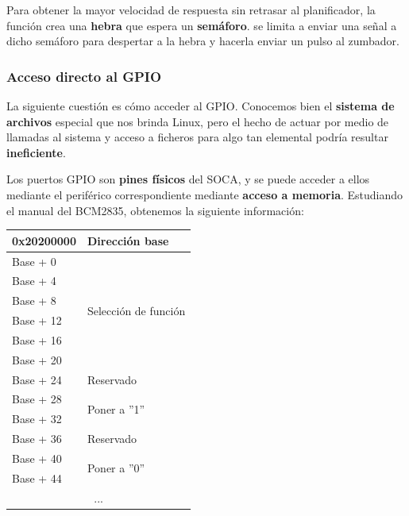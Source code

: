 Para obtener la mayor velocidad de respuesta sin retrasar al planificador, la función  crea una \textbf{hebra} que espera un \textbf{semáforo}.  se limita a enviar una señal a dicho semáforo para despertar a la hebra y hacerla enviar un pulso al zumbador.

\subsubsection{Acceso directo al GPIO}

La siguiente cuestión es cómo acceder al \acrshort{GPIO}. Conocemos bien el \textbf{sistema de archivos} especial que nos brinda Linux, pero el hecho de actuar por medio de llamadas al sistema y acceso a ficheros para algo tan elemental podría resultar \textbf{ineficiente}.

Los puertos \acrshort{GPIO} son \textbf{pines físicos} del \acrshort{SOCA}, y se puede acceder a ellos mediante el periférico correspondiente mediante \textbf{acceso a memoria}. Estudiando el manual del BCM2835, obtenemos la siguiente información:

\smallskip

\begin{center}
	\begin{tabular}{|l|l|}
		\hline 0x20200000 & Dirección base \\
		\hline
		\hline Base + 0 & \multirow{6}{*}{Selección de función} \\
		\cline{1-1} Base + 4 & \\
		\cline{1-1} Base + 8 & \\
		\cline{1-1} Base + 12 & \\
		\cline{1-1} Base + 16 & \\
		\cline{1-1} Base + 20 & \\
		\hline Base + 24 & Reservado \\
		\hline Base + 28 & \multirow{2}{*}{Poner a ''1''} \\
		\cline{1-1} Base + 32 & \\
		\hline Base + 36 & Reservado \\
		\hline Base + 40 & \multirow{2}{*}{Poner a ''0''} \\
		\cline{1-1} Base + 44 & \\
		\hline \multicolumn{2}{|c|}{...} \\
		\hline 
	\end{tabular}
	\smallskip
\end{center}

